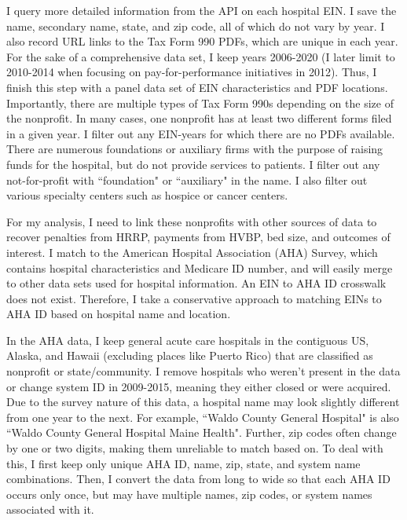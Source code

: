 \documentclass[12pt]{article}
\begin{document}
I query more detailed information from the API on each hospital EIN. I save the name, secondary name, state, and zip code, all of which do not vary by year. I also record URL links to the Tax Form 990 PDFs, which are unique in each year. For the sake of a comprehensive data set, I keep years 2006-2020 (I later limit to 2010-2014 when focusing on pay-for-performance initiatives in 2012). Thus, I finish this step with a panel data set of EIN characteristics and PDF locations. Importantly, there are multiple types of Tax Form 990s depending on the size of the nonprofit. In many cases, one nonprofit has at least two different forms filed in a given year. I filter out any EIN-years for which there are no PDFs available. There are numerous foundations or auxiliary firms with the purpose of raising funds for the hospital, but do not provide services to patients. I filter out any not-for-profit with ``foundation" or ``auxiliary" in the name. I also filter out various specialty centers such as hospice or cancer centers.  

For my analysis, I need to link these nonprofits with other sources of data to recover penalties from HRRP, payments from HVBP, bed size, and outcomes of interest. I match to the American Hospital Association (AHA) Survey, which contains hospital characteristics and Medicare ID number, and will easily merge to other data sets used for hospital information. An EIN to AHA ID crosswalk does not exist. Therefore, I take a conservative approach to matching EINs to AHA ID based on hospital name and location. 

In the AHA data, I keep general acute care hospitals in the contiguous US, Alaska, and Hawaii (excluding places like Puerto Rico) that are classified as nonprofit or state/community. I remove hospitals who weren't present in the data or change system ID in 2009-2015, meaning they either closed or were acquired. Due to the survey nature of this data, a hospital name may look slightly different from one year to the next. For example, ``Waldo County General Hospital" is also ``Waldo County General Hospital Maine Health". Further, zip codes often change by one or two digits, making them unreliable to match based on. To deal with this, I first keep only unique AHA ID, name, zip, state, and system name combinations. Then, I convert the data from long to wide so that each AHA ID occurs only once, but may have multiple names, zip codes, or system names associated with it.
\end{document}
